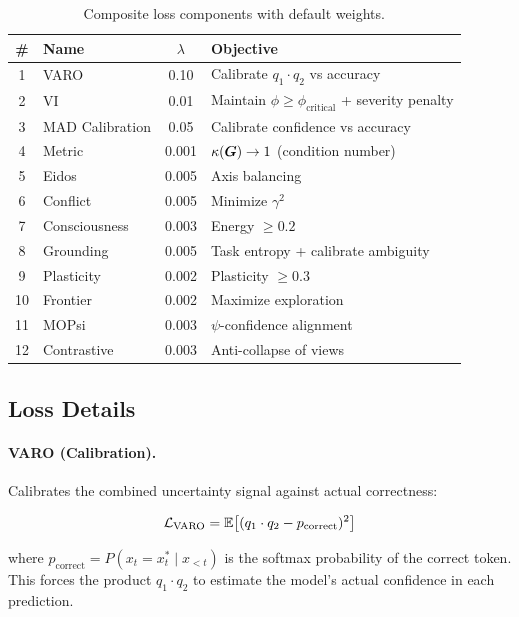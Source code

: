 \begin{table}[H]
\centering
\caption{Composite loss components with default weights.}
\label{tab:losses}
\begin{tabular}{clcp{6cm}}
\toprule
\textbf{\#} & \textbf{Name} & \textbf{$\lambda$} & \textbf{Objective} \\
\midrule
1 & VARO & 0.10 & Calibrate $q_1 \cdot q_2$ vs accuracy \\
2 & VI & 0.01 & Maintain $\phi \geq \phi_{\text{critical}}$ + severity penalty \\
3 & MAD Calibration & 0.05 & Calibrate confidence vs accuracy \\
4 & Metric & 0.001 & $\kappa(\bm{G}) \to 1$ (condition number) \\
5 & Eidos & 0.005 & Axis balancing \\
6 & Conflict & 0.005 & Minimize $\gamma^2$ \\
7 & Consciousness & 0.003 & Energy $\geq 0.2$ \\
8 & Grounding & 0.005 & Task entropy + calibrate ambiguity \\
9 & Plasticity & 0.002 & Plasticity $\geq 0.3$ \\
10 & Frontier & 0.002 & Maximize exploration \\
11 & MOPsi & 0.003 & $\psi$-confidence alignment \\
12 & Contrastive & 0.003 & Anti-collapse of views \\
\bottomrule
\end{tabular}
\end{table}

\subsection{Loss Details}

\paragraph{VARO (Calibration).}
Calibrates the combined uncertainty signal against actual correctness:

\begin{equation}
    \mathcal{L}_{\text{VARO}} = \mathbb{E}\big[(q_1 \cdot q_2 - p_{\text{correct}})^2\big]
\end{equation}

where $p_{\text{correct}} = P(x_t = x_t^* \mid x_{<t})$ is the softmax
probability of the correct token. This forces the product $q_1 \cdot q_2$
to estimate the model's actual confidence in each prediction.

